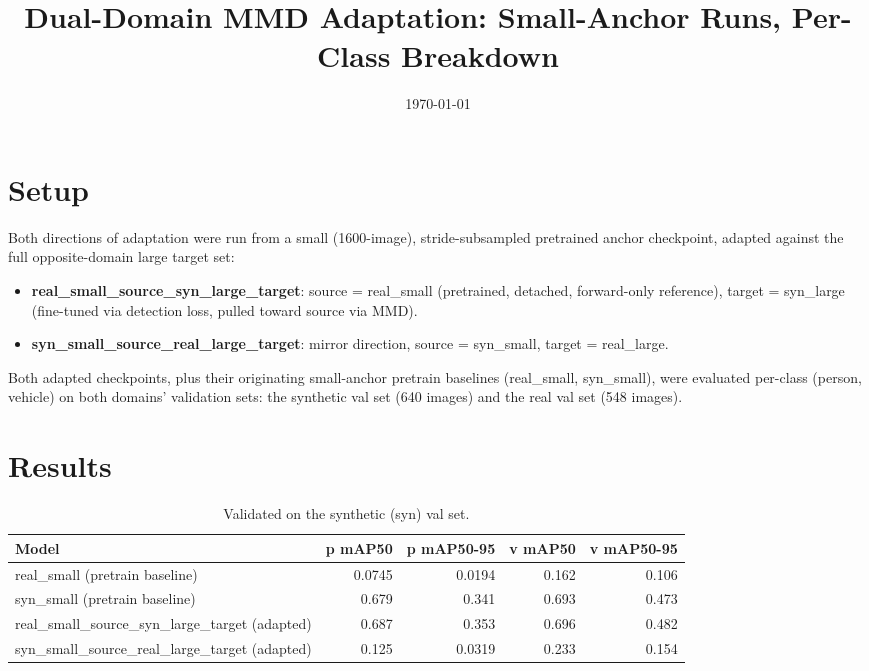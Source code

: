 \documentclass[11pt]{article}
\title{Dual-Domain MMD Adaptation: Small-Anchor Runs, Per-Class Breakdown}
\author{}
\date{\today}
\begin{document}
\maketitle

\section{Setup}

Both directions of adaptation were run from a small (1600-image), stride-subsampled
pretrained anchor checkpoint, adapted against the full opposite-domain large target set:

\begin{itemize}
    \item \textbf{real\_small\_source\_syn\_large\_target}: source = real\_small (pretrained,
    detached, forward-only reference), target = syn\_large (fine-tuned via detection loss,
    pulled toward source via MMD).
    \item \textbf{syn\_small\_source\_real\_large\_target}: mirror direction, source =
    syn\_small, target = real\_large.
\end{itemize}

Both adapted checkpoints, plus their originating small-anchor pretrain baselines
(real\_small, syn\_small), were evaluated per-class (person, vehicle) on both domains'
validation sets: the synthetic val set (640 images) and the real val set (548 images).

\section{Results}

\begin{table}[h!]
    \centering
    \begin{tabular}{lrrrr}
        \toprule
        Model & p mAP50 & p mAP50-95 & v mAP50 & v mAP50-95 \\
        \midrule
        real\_small (pretrain baseline) & 0.0745 & 0.0194 & 0.162 & 0.106 \\
        syn\_small (pretrain baseline) & 0.679 & 0.341 & 0.693 & 0.473 \\
        real\_small\_source\_syn\_large\_target (adapted) & 0.687 & 0.353 & 0.696 & 0.482 \\
        syn\_small\_source\_real\_large\_target (adapted) & 0.125 & 0.0319 & 0.233 & 0.154 \\
        \bottomrule
    \end{tabular}
    \caption{Validated on the synthetic (syn) val set.}
\end{table}
\end{document}
